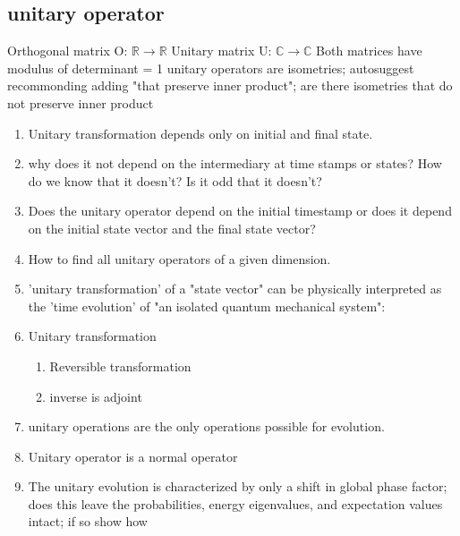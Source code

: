 \documentclass[a4paper,12pt]{amsbook}
\newcommand{\0}{{$|0\rangle$}}
\newcommand{\1}{{$|1\rangle$}}
\begin{document}
\subsection{unitary operator}
Orthogonal matrix O: $\mathbb{R} \rightarrow \mathbb{R}$
Unitary matrix U: $\mathbb{C} \rightarrow \mathbb{C}$ 
Both matrices have modulus of determinant = 1 
unitary operators are isometries; autosuggest recommonding adding "that preserve inner product"; are there isometries that do not preserve inner product
\begin{enumerate}    
    \item Unitary transformation depends only on initial and final state.
    \item why does it not depend on the intermediary at time stamps or states? How do we know that it doesn't? Is it odd that it doesn't?
    \item Does the unitary operator depend on the initial timestamp or does it depend on the initial state vector and the final state vector?
    
    \item How to find all unitary operators of a given dimension.
    
    \item 'unitary transformation' of a "state vector" can be physically interpreted as the 'time evolution' of "an isolated quantum mechanical system":
    \item Unitary transformation
    \begin{enumerate} %
        \item Reversible transformation
        \item inverse is adjoint
    \end{enumerate}

    \item unitary operations are the only operations possible for evolution.
    \item Unitary operator is a normal operator
    \item The unitary evolution is characterized by only a shift in global phase factor; does this leave the probabilities, energy eigenvalues, and expectation values intact; if so show how

\end{enumerate}
    
\end{document}
